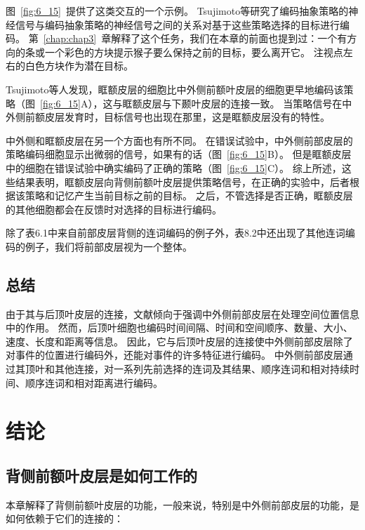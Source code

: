 图~\ref{fig:6_15}~提供了这类交互的一个示例。
Tsujimoto等\cite{tsujimoto2011comparison}研究了编码抽象策略的神经信号与编码抽象策略的神经信号之间的关系对基于这些策略选择的目标进行编码。
第~\ref{chap:chap3}~章解释了这个任务，我们在本章的前面也提到过：一个有方向的条或一个彩色的方块提示猴子要么保持之前的目标，要么离开它。
注视点左右的白色方块作为潜在目标。


Tsujimoto等人发现，眶额皮层的细胞比中外侧前额叶皮层的细胞更早地编码该策略（图~\ref{fig:6_15}A），这与眶额皮层与下颞叶皮层的连接一致。
当策略信号在中外侧前额皮层发育时，目标信号也出现在那里，这是眶额皮层没有的特性。


中外侧和眶额皮层在另一个方面也有所不同。
在错误试验中，中外侧前部皮层的策略编码细胞显示出微弱的信号，如果有的话（图~\ref{fig:6_15}B）。
但是眶额皮层中的细胞在错误试验中确实编码了正确的策略（图~\ref{fig:6_15}C）。
综上所述，这些结果表明，眶额皮层向背侧前额叶皮层提供策略信号，在正确的实验中，后者根据该策略和记忆产生当前目标之前的目标。
之后，不管选择是否正确，眶额皮层的其他细胞都会在反馈时对选择的目标进行编码。


除了表6.1中来自前部皮层背侧的连词编码的例子外，表8.2中还出现了其他连词编码的例子，我们将前部皮层视为一个整体。



\subsection{总结}

由于其与后顶叶皮层的连接，文献倾向于强调中外侧前部皮层在处理空间位置信息中的作用。
然而，后顶叶细胞也编码时间间隔、时间和空间顺序、数量、大小、速度、长度和距离等信息。
因此，它与后顶叶皮层的连接使中外侧前部皮层除了对事件的位置进行编码外，还能对事件的许多特征进行编码。
中外侧前部皮层通过其顶叶和其他连接，对一系列先前选择的连词及其结果、顺序连词和相对持续时间、顺序连词和相对距离进行编码。



\section{结论}

\subsection{背侧前额叶皮层是如何工作的}

本章解释了背侧前额叶皮层的功能，一般来说，特别是中外侧前部皮层的功能，是如何依赖于它们的连接的：
\par

